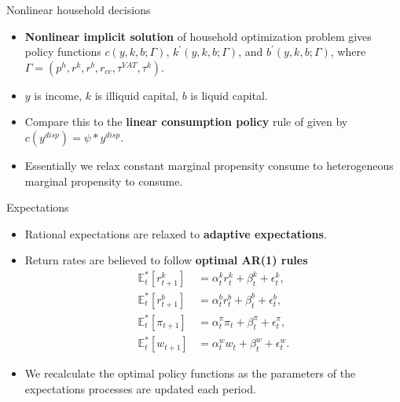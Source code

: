 \documentclass[9pt]{beamer}
\begin{document}
\begin{frame}{Nonlinear household decisions}
\small
\begin{itemize}
\item \textbf{Nonlinear implicit solution} of household optimization problem gives policy functions $c(y,k,b;\Gamma)$, $k^\prime(y,k,b;\Gamma)$, and $b^\prime(y,k,b;\Gamma)$, where $\Gamma =(p^h,r^k,r^b, r_{cc},\tau^{VAT},\tau^k)$.
\item $y$ is income, $k$ is illiquid capital, $b$ is liquid capital.
\item Compare this to the \textbf{linear consumption policy} rule of \cite{poledna_economic_2019} given by $c(y^{disp})= \psi * y^{disp}$.
\item Essentially we relax constant marginal propensity consume to heterogeneous marginal propensity to consume.
\end{itemize}
\end{frame}
\begin{frame}{Expectations}
\begin{itemize}
\item Rational expectations are relaxed to \textbf{adaptive expectations}.
    \item Return rates are believed to follow \textbf{optimal AR(1) rules}
\begin{align}    \mathbb{E}^*_t[r^k_{t+1}]&=\alpha^k_{t} r^k_t +\beta^k_{t}+\epsilon^k_t,\\    \mathbb{E}^*_t[r^b_{t+1}]&=\alpha^b_{t} r^b_t +\beta^b_{t}+\epsilon^b_t, \\
 \mathbb{E}^*_t[\pi_{t+1}] &=\alpha^\pi_t \pi_t+\beta^\pi_{t}+\epsilon^\pi_{t}, \\
\mathbb{E}^*_t[w_{t+1}]&=\alpha^w_{t} w_t +\beta^w_{t}+\epsilon^w_t. 
\end{align}
\item We recalculate the optimal policy functions as the parameters of the expectations processes are updated each period.
\end{itemize}
\end{frame}
\end{document}
